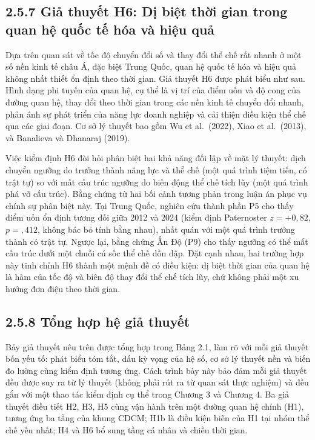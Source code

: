 \documentclass[
  a4paper,
  13pt]{extreport}
\begin{document}
\hypertarget{giux1ea3-thuyux1ebft-h6-dux1ecb-biux1ec7t-thux1eddi-gian-trong-quan-hux1ec7-quux1ed1c-tux1ebf-huxf3a-vuxe0-hiux1ec7u-quux1ea3}{%
\subsection{2.5.7 Giả thuyết H6: Dị biệt thời gian trong quan hệ quốc tế
hóa và hiệu
quả}\label{giux1ea3-thuyux1ebft-h6-dux1ecb-biux1ec7t-thux1eddi-gian-trong-quan-hux1ec7-quux1ed1c-tux1ebf-huxf3a-vuxe0-hiux1ec7u-quux1ea3}}

Dựa trên quan sát về tốc độ chuyển đổi số và thay đổi thể chế rất nhanh
ở một số nền kinh tế châu Á, đặc biệt Trung Quốc, quan hệ quốc tế hóa và
hiệu quả không nhất thiết ổn định theo thời gian. Giả thuyết H6 được
phát biểu như sau. Hình dạng phi tuyến của quan hệ, cụ thể là vị trí của
điểm uốn và độ cong của đường quan hệ, thay đổi theo thời gian trong các
nền kinh tế chuyển đổi nhanh, phản ánh sự phát triển của năng lực doanh
nghiệp và cải thiện điều kiện thể chế qua các giai đoạn. Cơ sở lý thuyết
bao gồm Wu et al.~(2022), Xiao et al.~(2013), và Banalieva và Dhanaraj
(2019).

Việc kiểm định H6 đòi hỏi phân biệt hai khả năng đối lập về mặt lý
thuyết: dịch chuyển ngưỡng do trưởng thành năng lực và thể chế (một quá
trình tiệm tiến, có trật tự) so với mất cấu trúc ngưỡng do biến động thể
chế tích lũy (một quá trình phá vỡ cấu trúc). Bằng chứng từ hai bối cảnh
tương phản trong luận án phục vụ chính sự phân biệt này. Tại Trung Quốc,
nghiên cứu thành phần P5 cho thấy điểm uốn ổn định tương đối giữa 2012
và 2024 (kiểm định Paternoster \(z = +0{,}82\), \(p = {,}412\), không
bác bỏ tính bằng nhau), nhất quán với một quá trình trưởng thành có trật
tự. Ngược lại, bằng chứng Ấn Độ (P9) cho thấy ngưỡng có thể mất cấu trúc
dưới một chuỗi cú sốc thể chế dồn dập. Đặt cạnh nhau, hai trường hợp này
tinh chỉnh H6 thành một mệnh đề có điều kiện: dị biệt thời gian của quan
hệ là hàm của tốc độ và biên độ thay đổi thể chế tích lũy, chứ không
phải một xu hướng đơn điệu theo thời gian.

\hypertarget{tux1ed5ng-hux1ee3p-hux1ec7-giux1ea3-thuyux1ebft}{%
\subsection{2.5.8 Tổng hợp hệ giả
thuyết}\label{tux1ed5ng-hux1ee3p-hux1ec7-giux1ea3-thuyux1ebft}}

Bảy giả thuyết nêu trên được tổng hợp trong Bảng 2.1, làm rõ với mỗi giả
thuyết bốn yếu tố: phát biểu tóm tắt, dấu kỳ vọng của hệ số, cơ sở lý
thuyết nền và biến đo lường cùng kiểm định tương ứng. Cách trình bày này
bảo đảm mỗi giả thuyết đều được suy ra từ lý thuyết (không phải rút ra
từ quan sát thực nghiệm) và đều gắn với một thao tác kiểm định cụ thể
trong Chương 3 và Chương 4. Ba giả thuyết điều tiết H2, H3, H5 cùng vận
hành trên một đường quan hệ chính (H1), tương ứng ba tầng của khung
CDCM; H1b là điều kiện biên của H1 tại nhóm thể chế yếu nhất; H4 và H6
bổ sung tầng cá nhân và chiều thời gian.
\end{document}
